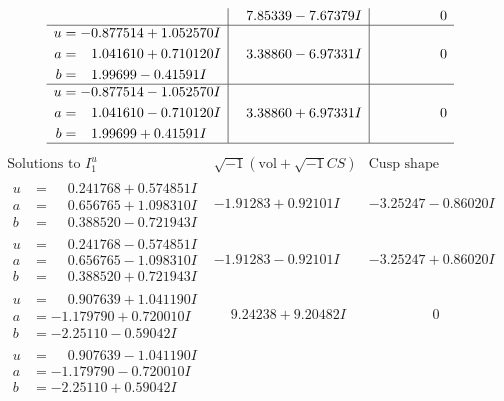 \documentclass[1p]{elsarticle_modified}
\theoremstyle{definition}
\newcommand{\I}{\sqrt{-1}}
\begin{document}
$$\begin{array}{c|c|c}
 & \phantom{-}7.85339 - 7.67379 I & \phantom{-0.000000 } 0 \\ \hline\begin{aligned}
u &= -0.877514 + 1.052570 I \\
a &= \phantom{-}1.041610 + 0.710120 I \\
b &= \phantom{-}1.99699 - 0.41591 I\end{aligned}
 & \phantom{-}3.38860 - 6.97331 I & \phantom{-0.000000 } 0 \\ \hline\begin{aligned}
u &= -0.877514 - 1.052570 I \\
a &= \phantom{-}1.041610 - 0.710120 I \\
b &= \phantom{-}1.99699 + 0.41591 I\end{aligned}
 & \phantom{-}3.38860 + 6.97331 I & \phantom{-0.000000 } 0\\
 \hline 
 \end{array}$$\newpage$$\begin{array}{c|c|c}  
\text{Solutions to }I^u_{1}& \I (\text{vol} + \sqrt{-1}CS) & \text{Cusp shape}\\
 \hline 
\begin{aligned}
u &= \phantom{-}0.241768 + 0.574851 I \\
a &= \phantom{-}0.656765 + 1.098310 I \\
b &= \phantom{-}0.388520 - 0.721943 I\end{aligned}
 & -1.91283 + 0.92101 I & -3.25247 - 0.86020 I \\ \hline\begin{aligned}
u &= \phantom{-}0.241768 - 0.574851 I \\
a &= \phantom{-}0.656765 - 1.098310 I \\
b &= \phantom{-}0.388520 + 0.721943 I\end{aligned}
 & -1.91283 - 0.92101 I & -3.25247 + 0.86020 I \\ \hline\begin{aligned}
u &= \phantom{-}0.907639 + 1.041190 I \\
a &= -1.179790 + 0.720010 I \\
b &= -2.25110 - 0.59042 I\end{aligned}
 & \phantom{-}9.24238 + 9.20482 I & \phantom{-0.000000 } 0 \\ \hline\begin{aligned}
u &= \phantom{-}0.907639 - 1.041190 I \\
a &= -1.179790 - 0.720010 I \\
b &= -2.25110 + 0.59042 I\end{aligned}

\end{array}$$
\end{document}
